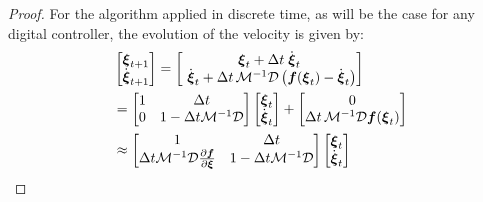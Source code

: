 \begin{proof}
For the algorithm applied in discrete time, as will be the case for any digital controller, the evolution of the velocity is given by:
\begin{equation}
	\begin{split}
	& \begin{bmatrix}
	 \vecs \xi_{t+1} \\ \dot{\vecs \xi}_{t+1}
	\end{bmatrix}
	=
	\begin{bmatrix}
		\vect \xi_t + \Delta t  \; \dot{\vect \xi}_t \\ \
		\dot{\vecs \xi}_t + \Delta t \, \matd{M}^{-1} \matd{D} \left( \vect f(\vecs \xi_t) - \dot{\vecs \xi}_t \right)
	\end{bmatrix} \\
	&  =
	\begin{bmatrix}
		1 & \Delta t \\
		0 & 1 - \Delta t \matd{M}^{-1} \matd D 
	\end{bmatrix}
	\begin{bmatrix}
		\vect \xi_t \\ \dot{\vect \xi}_t
	\end{bmatrix}
	+ \begin{bmatrix}
		0 \\ 
		\Delta t \, \matd{M}^{-1} \matd{D} \vect f(\vecs \xi_t) 
	\end{bmatrix} \\
	& \approx 
	\begin{bmatrix}
		1 & \Delta t \\
		\Delta t \matd{M}^{-1} \matd D \frac{\partial \vect f}{\partial \vecs \xi} & 1 - \Delta t \matd{M}^{-1} \matd D 
	\end{bmatrix}
	\begin{bmatrix}
		\vect \xi_t \\ \dot{\vect \xi}_t
	\end{bmatrix}
	\label{eq:discrete_time_proof}
	\end{split}
\end{equation}


\end{proof}
